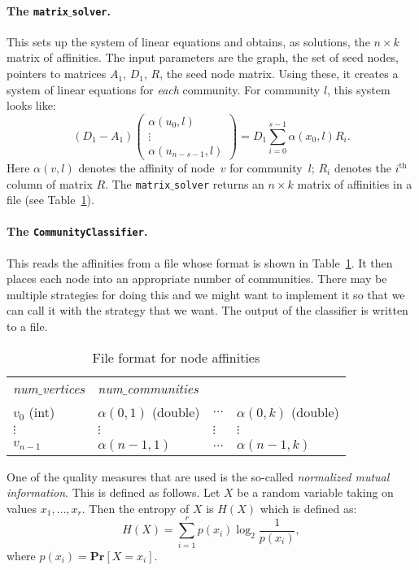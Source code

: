 \documentclass[12pt]{article}
\renewcommand{\th}{\ensuremath{^{\mathrm{th}}}}
\renewcommand{\Pr}[1]{\ensuremath{\mathbf{Pr} \left [ #1 \right]}}
\begin{document}
\paragraph{The \texttt{matrix$\_$solver}.} This sets up the system of 
linear equations and obtains, as solutions, the $n \times k$ matrix 
of affinities. The input parameters are the graph, the set of seed nodes, 
pointers to matrices $A_1$, $D_1$, $R$, the seed node matrix. Using these, 
it creates a system of linear equations for \emph{each} community.   
For community $l$, this system looks like:
\[
	(D_1 -  A_1) \begin{pmatrix} \alpha(u_0, l) \\ \vdots \\ \alpha(u_{n - s -1}, l) \end{pmatrix}	
		= D_1 \sum_{i = 0}^{s - 1} \alpha(x_0, l) R_i. 
\] 
Here $\alpha(v, l)$ denotes the affinity of node~$v$ for community~$l$; $R_i$ 
denotes the $i\th$ column of matrix $R$. The \texttt{matrix$\_$solver} returns 
an $n \times k$ matrix of affinities in a file (see Table~\ref{tab:node_aff}).

\paragraph{The \texttt{CommunityClassifier}.} This reads the affinities 
from a file whose format is shown in Table~\ref{tab:node_aff}.
It then places each node into an appropriate number of communities. There 
may be multiple strategies for doing this and we might want to implement it 
so that we can call it with the strategy that we want. The output of the 
classifier is written to a file.

\begin{table}[ht]
\centering
\begin{tabular}{llll}
\emph{num$\_$vertices} & \emph{num$\_$communities} &  & \\
$v_0$ (int)              & $\alpha(0, 1)$ (double) & $\ldots$ & $\alpha(0, k)$ (double) \\
$\vdots$ & $\vdots$ & $\vdots$ & $\vdots$ \\
$v_{n-1}$  & $\alpha(n-1, 1)$ & $\ldots$ & $\alpha(n-1, k)$ 
\end{tabular}
\caption{File format for node affinities}\label{tab:node_aff}
\end{table}
%

One of the quality measures that are used is the so-called \emph{normalized
mutual information}. This is defined as follows. Let $X$ be a random variable 
taking on values $x_1, \ldots, x_r$. Then the entropy of $X$ is $H(X)$ 
which is defined as:
\[
	H(X) = \sum_{i = 1}^r p(x_i) \log_2 \frac{1}{p(x_i)}, 
\]
where $p(x_i) = \Pr{X = x_i}$.
\end{document}
